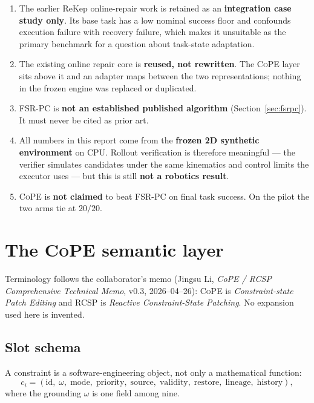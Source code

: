 \documentclass[11pt]{article}
\newcommand{\cope}{\textsc{CoPE}}
\newcommand{\fsrpc}{\textsc{FSR-PC}}
\begin{document}
\begin{enumerate}[leftmargin=*]
\item The earlier ReKep online-repair work is retained as an \textbf{integration
case study only}. Its base task has a low nominal success floor and confounds
execution failure with recovery failure, which makes it unsuitable as the
primary benchmark for a question about task-state adaptation.
\item The existing online repair core is \textbf{reused, not rewritten}. The
\cope{} layer sits above it and an adapter maps between the two
representations; nothing in the frozen engine was replaced or duplicated.
\item \fsrpc{} is \textbf{not an established published algorithm}
(Section~\ref{sec:fsrpc}). It must never be cited as prior art.
\item All numbers in this report come from the \textbf{frozen 2D synthetic
environment} on CPU. Rollout verification is therefore meaningful --- the
verifier simulates candidates under the same kinematics and control limits the
executor uses --- but this is still \textbf{not a robotics result}.
\item \cope{} is \textbf{not claimed} to beat \fsrpc{} on final task success. On
the pilot the two arms tie at $20/20$.
\end{enumerate}

\section{The \cope{} semantic layer}

Terminology follows the collaborator's memo (Jingsu Li, \emph{CoPE / RCSP
Comprehensive Technical Memo}, v0.3, 2026--04--26): \cope{} is
\emph{Constraint-state Patch Editing} and RCSP is \emph{Reactive
Constraint-State Patching}. No expansion used here is invented.

\subsection{Slot schema}
A constraint is a software-engineering object, not only a mathematical function:
\[
c_i = (\mathrm{id},\; \omega,\; \mathrm{mode},\; \mathrm{priority},\;
\mathrm{source},\; \mathrm{validity},\; \mathrm{restore},\; \mathrm{lineage},\;
\mathrm{history}),
\]
where the grounding $\omega$ is one field among nine.
\end{document}
